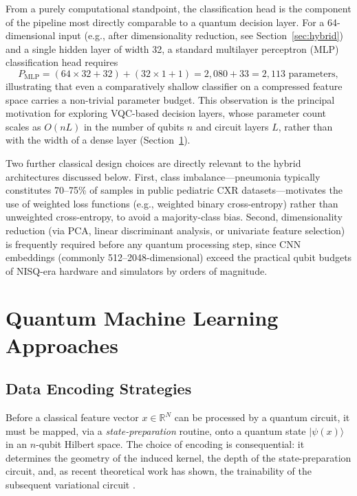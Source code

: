 \documentclass[11pt,a4paper]{article}
\begin{document}
From a purely computational standpoint, the classification head is the
component of the pipeline most directly comparable to a quantum decision
layer.  For a 64-dimensional input (e.g., after dimensionality reduction,
see Section~\ref{sec:hybrid}) and a single hidden layer of width 32, a
standard multilayer perceptron (MLP) classification head requires
\begin{equation}
  P_{\text{MLP}} = (64 \times 32 + 32) + (32 \times 1 + 1) = 2{,}080 + 33
  = 2{,}113 \text{ parameters},
  \label{eq:mlp_params}
\end{equation}
illustrating that even a comparatively shallow classifier on a compressed
feature space carries a non-trivial parameter budget.  This observation is the
principal motivation for exploring VQC-based decision layers, whose parameter
count scales as $O(nL)$ in the number of qubits $n$ and circuit layers $L$,
rather than with the width of a dense layer (Section~\ref{sec:qml}).

Two further classical design choices are directly relevant to the hybrid
architectures discussed below.  First, class imbalance---pneumonia typically
constitutes 70--75\% of samples in public pediatric CXR datasets---motivates
the use of weighted loss functions (e.g., weighted binary cross-entropy) rather
than unweighted cross-entropy, to avoid a majority-class bias.  Second,
dimensionality reduction (via PCA, linear discriminant analysis, or univariate
feature selection) is frequently required before any quantum processing step,
since CNN embeddings (commonly 512--2048-dimensional) exceed the practical
qubit budgets of NISQ-era hardware and simulators by orders of magnitude.

\section{Quantum Machine Learning Approaches}
\label{sec:qml}

\subsection{Data Encoding Strategies}
\label{sec:encoding}

Before a classical feature vector $x \in \mathbb{R}^N$ can be processed by a
quantum circuit, it must be mapped, via a \emph{state-preparation} routine,
onto a quantum state $\lvert \psi(x) \rangle$ in an $n$-qubit Hilbert space.
The choice of encoding is consequential: it determines the geometry of the
induced kernel, the depth of the state-preparation circuit, and, as recent
theoretical work has shown, the trainability of the subsequent variational
circuit \cite{kashif2023,schuld2021kernel}.
\end{document}
